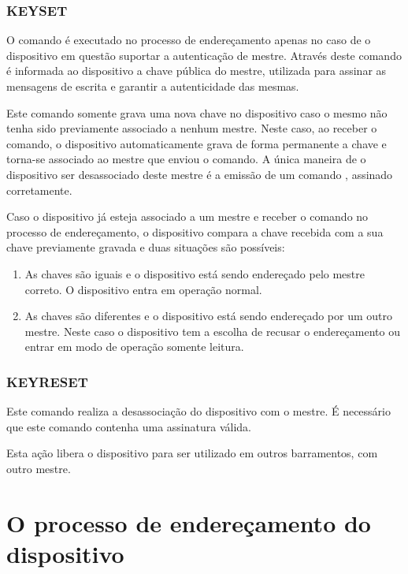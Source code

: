 \documentclass[11pt]{report}
\begin{document}
\subsubsection{KEYSET}

O comando  é executado no processo de endereçamento apenas no caso de o dispositivo em questão suportar a autenticação de mestre. Através deste comando é informada ao dispositivo a chave pública do mestre, utilizada para assinar as mensagens de escrita e garantir a autenticidade das mesmas.

Este comando somente grava uma nova chave no dispositivo caso o mesmo não tenha sido previamente associado a nenhum mestre. Neste caso, ao receber o comando, o dispositivo automaticamente grava de forma permanente a chave e torna-se associado ao mestre que enviou o comando. A única maneira de o dispositivo ser desassociado deste mestre é a emissão de um comando , assinado corretamente.

Caso o dispositivo já esteja associado a um mestre e receber o comando  no processo de endereçamento, o dispositivo compara a chave recebida com a sua chave previamente gravada e duas situações são possíveis:

\begin{enumerate}

\item As chaves são iguais e o dispositivo está sendo endereçado pelo mestre correto. O dispositivo entra em operação normal.

\item As chaves são diferentes e o dispositivo está sendo endereçado por um outro mestre. Neste caso o dispositivo tem a escolha de recusar o endereçamento ou entrar em modo de operação somente leitura.

\end{enumerate}

\subsubsection{KEYRESET}

Este comando realiza a desassociação do dispositivo com o mestre. É necessário que este comando contenha uma assinatura válida.

Esta ação libera o dispositivo para ser utilizado em outros barramentos, com outro mestre.

\section{O processo de endereçamento do dispositivo}
\end{document}
